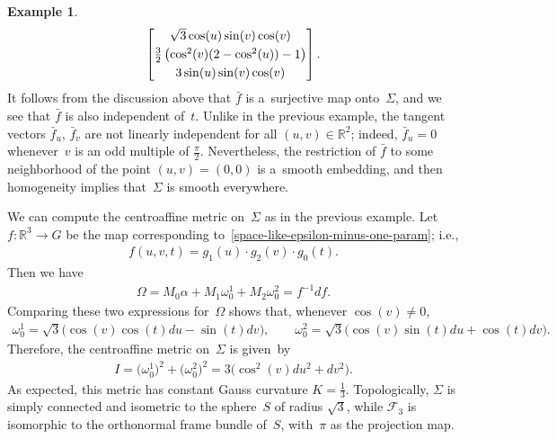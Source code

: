 \documentclass[pdftex]{sigma}
\numberwithin{equation}{section}
\theoremstyle{definition}
\newtheorem{exmpl}[teo]{Example}
\begin{document}
\begin{exmpl}
\begin{gather}
\begin{bmatrix}
\sqrt{3} \cos(u) \sin(v) \cos(v)
\vspace{1mm}\\
\tfrac{3}{2}\left(\cos^2(v) (2 - \cos^2(u)) - 1 \right)
\vspace{1mm}\\
3 \sin(u) \sin(v) \cos(v)
\end{bmatrix}.
\label{space-like-epsilon-minus-one-param}
\end{gather}
It follows from the discussion above that $\bar{f}$ is a~surjective map onto~$\Sigma$, and we see that $\bar{f}$ is also
independent of~$t$.
Unlike in the previous example, the tangent vectors $\bar{f}_u$, $\bar{f}_v$ are not linearly independent for all $(u,v)
\in \mathbb{R}^2$; indeed, $\bar{f}_u=0$ whenever~$v$ is an odd multiple of $\frac{\pi}{2}$.
Nevertheless, the restriction of $\bar{f}$ to some neighborhood of the point $(u,v) = (0,0)$ is a~smooth embedding, and
then homogeneity implies that~$\Sigma$ is smooth everywhere.

We can compute the centroaf\/f\/ine metric on~$\Sigma$ as in the previous example.
Let $f:\mathbb{R}^3 \to G$ be the map corresponding to~\eqref{space-like-epsilon-minus-one-param}; i.e.,
\begin{gather*}
f(u,v,t) = g_1(u) \cdot g_2(v) \cdot g_0(t).
\end{gather*}
Then we have
\begin{gather*}
\Omega = M_0  \alpha + M_1  \omega^1_0 + M_2  \omega^2_0 = f^{-1}  d f.
\end{gather*}
Comparing these two expressions for~$\Omega$ shows that, whenever $\cos(v) \neq 0$,
\begin{gather*}
\omega^1_0 = \sqrt{3}\big(\cos (v) \cos(t)  du - \sin(t) dv \big),
\qquad
\omega^2_0 = \sqrt{3}\big(\cos (v) \sin(t)   du + \cos(t)  dv \big).
\end{gather*}
Therefore, the centroaf\/f\/ine metric on~$\Sigma$ is given~by
\begin{gather*}
I = \big(\omega^1_0\big)^2 + \big(\omega^2_0\big)^2 = 3\big(\cos^2(v)  du^2 + dv^2\big).
\end{gather*}
As expected, this metric has constant Gauss curvature $K = \frac{1}{3}$.
Topologically, $\Sigma$ is simply connected and isometric to the sphere~$S$ of radius $\sqrt{3}$, while $\mathcal{F}_3$
is isomorphic to the orthonormal frame bundle of~$S$, with~$\pi$ as the projection map.


\end{exmpl}
\end{document}
